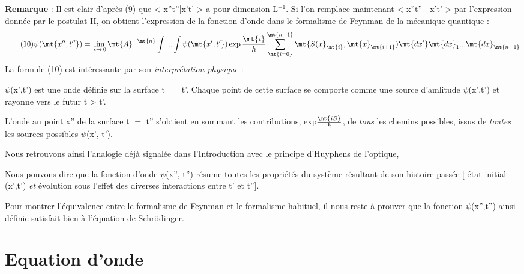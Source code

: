 %
{\bf Remarque} : Il est clair d'après (9) que < x''t''|x't' > a pour dimension L$^{-1}$.
Si l'on remplace maintenant < x''t'' | x't' > par l'expression donnée par le
postulat II, on obtient l'expression de la fonction d'onde dans le formalisme de Feynman de la mécanique quantique :
\[
\tag{10}\psi(\mt{x'',t''}) = \lim_{\,\epsilon \to \,0} \mt{A}^{-\mt{n}}
\int...\int\psi(\mt{x',t'})
\exp\frac{\mt{i}}{\hbar}\sum_\mt{i=0}^\mt{n-1} \mt{S (x}_\mt{i},\mt{x}_\mt{i+1})
\mt{ dx'}\mt{dx}_1...\mt{dx}_\mt{n-1}
\]
La formule (10) est intéressante par son {\it interprétation physique} :
\begin{center}
\end{center}
$\psi$(x',t') est une onde définie sur la surface t $=$ t'. Chaque point de cette
surface se comporte comme une source d'amlitude $\psi$(x',t') et rayonne vers
le futur t > t'.

L'onde au point x'' de la surface t $=$ t'' s'obtient en sommant les
contributions, exp$\frac{\mt{iS}}{\hbar}$, de {\it tous} les chemins possibles,
issus de {\it toutes} les sources possibles $\psi$(x', t').

Nous retrouvons ainsi l'analogie déjà signalée dans l'Introduction
avec le principe d'Huyphens de l'optique,

Nous pouvons dire que la fonction d'onde $\psi$(x'', t'') résume toutes les
propriétés du système résultant de son histoire passée $[$ état initial (x',t')
{\it et} évolution sous l'effet des diverses interactions entre t' et t''$]$.

Pour montrer l'équivalence entre le formalisme de Feynman et le
formalisme habituel, il nous reste à prouver que la fonction $\psi$(x'',t'') ainsi
définie satisfait bien à l'équation de Schrödinger.
%
\section{Equation d'onde}

